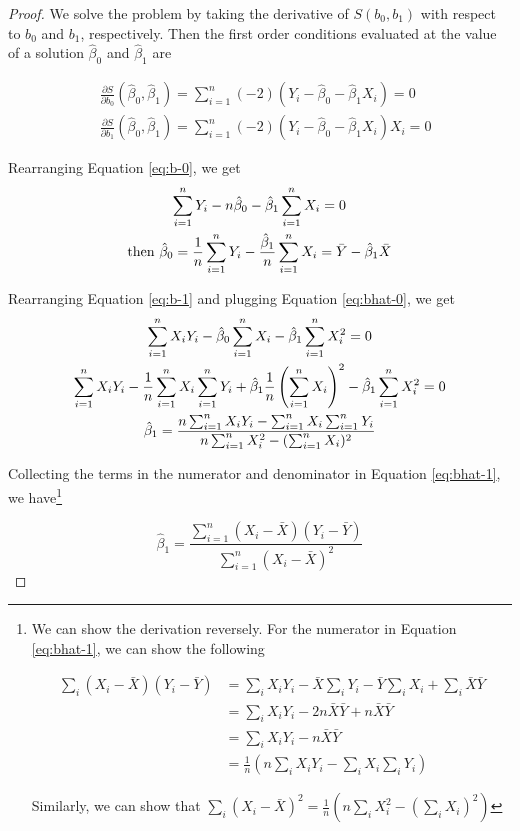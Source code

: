 \documentclass[a4paper,11pt]{article}
\begin{document}
\begin{proof}
We solve the problem by taking the derivative of $S(b_0, b_1)$ with respect to $b_0$ and $b_1$,
respectively. Then the first order conditions evaluated at the value of a solution $\hat{\beta}_0$
and $\hat{\beta}_1$ are

\begin{align}
& \frac{\partial S}{\partial b_0}(\hat{\beta}_0, \hat{\beta}_1) = \sum_{i=1}^n (-2)(Y_i - \hat{\beta}_0 - \hat{\beta}_1 X_i) = 0  \label{eq:b-0} \\
& \frac{\partial S}{\partial b_1}(\hat{\beta}_0, \hat{\beta}_1) = \sum_{i=1}^n (-2)(Y_i - \hat{\beta}_0 - \hat{\beta}_1 X_i) X_i = 0 \label{eq:b-1}
\end{align}

Rearranging Equation \ref{eq:b-0}, we get
\begin{gather}
\sum_{i=1}^n Y_i - n \hat{\beta}_0 - \hat{\beta}_1 \sum_{i=1}^n X_i = 0 \notag  \\
\text{then } \hat{\beta}_0 = \frac{1}{n} \sum_{i=1}^n Y_i - \frac{\hat{\beta}_1}{n}\sum_{i=1}^n X_i = \bar{Y} - \hat{\beta}_1 \bar{X} \label{eq:bhat-0}
\end{gather}

Rearranging Equation \ref{eq:b-1} and plugging Equation \ref{eq:bhat-0}, we get
\begin{gather}
\sum_{i=1}^n X_i Y_i - \hat{\beta}_0 \sum_{i=1}^n X_i - \hat{\beta}_1 \sum_{i=1}^n X^2_i = 0  \notag \\
\sum_{i=1}^n X_i Y_i - \frac{1}{n}\sum_{i=1}^n X_i \sum_{i=1}^n Y_i + \hat{\beta}_1 \frac{1}{n} \left(\sum_{i=1}^n X_i\right)^2 - \hat{\beta}_1 \sum_{i=1}^n X_i^2 = 0 \notag \\
\hat{\beta}_1 = \frac{n\sum_{i=1}^n X_i Y_i - \sum_{i=1}^n X_i \sum_{i=1}^n Y_i}{n\sum_{i=1}^n X_i^2 - (\sum_{i=1}^n X_i)^2} \label{eq:bhat-1}
\end{gather}

Collecting the terms in the numerator and denominator in Equation \ref{eq:bhat-1},
we have\footnote{We can show the derivation reversely.
For the numerator in Equation \ref{eq:bhat-1}, we can show the following

\begin{align*}
\sum_i(X_i - \bar{X})(Y_i - \bar{Y})
&= \sum_i X_iY_i - \bar{X}\sum_iY_i - \bar{Y}\sum_iX_i + \sum_i \bar{X}\bar{Y} \\
&= \sum_i X_iY_i - 2n\bar{X}\bar{Y} + n\bar{X}\bar{Y} \\
&= \sum_i X_iY_i - n\bar{X}\bar{Y} \\
&= \frac{1}{n} (n\sum_i X_iY_i - \sum_i X_i \sum_i Y_i)
\end{align*}

Similarly, we can show that $\sum_i (X_i - \bar{X})^2 = \frac{1}{n} (n\sum_i X_i^2 - (\sum_i X_i)^2)$
}

\begin{equation*}
\hat{\beta}_1 = \frac{\sum_{i=1}^n (X_i - \bar{X})(Y_i - \bar{Y})}{\sum_{i=1}^n (X_i - \bar{X})^2}
\end{equation*}

\end{proof}
\end{document}
